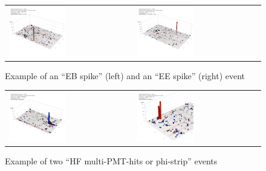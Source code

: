 %
\begin{figure}[h]
 \centering
 \begin{tabular}{ll}
   \includegraphics[width=0.47\textwidth]{fig/EBspike.png} &
   \includegraphics[width=0.47\textwidth]{fig/EEspike.png} \\
 \end{tabular}
\caption{Example of an ``EB spike'' (left) and an ``EE spike'' (right) event}
\label{fig:EBEEspike}
\end{figure}


%
\begin{figure}[h]
 \centering
 \begin{tabular}{ll}
   \includegraphics[width=0.47\textwidth]{fig/HFmultiHits.png} &
   \includegraphics[width=0.47\textwidth]{fig/HFmultiHits_2.png} \\
 \end{tabular}
\caption{Example of two ``HF multi-PMT-hits or phi-strip'' events}
\label{fig:HFmultiHits}
\end{figure}

